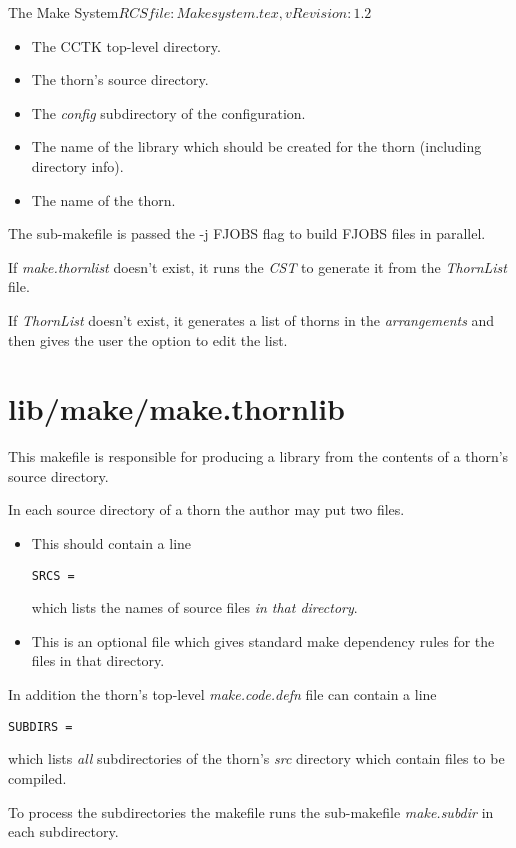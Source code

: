 \begin{cactuspart}{3}{The Make System}{$RCSfile: Makesystem.tex,v $}{$Revision: 1.2 $}
\begin{itemize}
\item[TOP]
The CCTK top-level directory.
\item[SRCDIR]
The thorn's source directory.
\item[CONFIG]
The {\em config} subdirectory of the configuration. 
\item[NAME]
The name of the library which should be created for the thorn
(including directory info).
\item[THORN]
The name of the thorn.
\end{itemize}

The sub-makefile is passed the -j FJOBS flag to build FJOBS files in parallel.

If {\em make.thornlist} doesn't exist, it runs the {\em CST} to generate it from
the {\em ThornList} file.

If {\em ThornList} doesn't exist, it generates a list of thorns in the 
{\em arrangements} and then gives the user the option to edit the
list.

\section{lib/make/make.thornlib}
\label{sec:makefiles:thornlib}

This makefile is responsible for producing a library from the contents of a
thorn's source directory.

In each source directory of a thorn the author may put two files.

\begin{itemize}
\item[make.code.defn]
This should contain a line
\begin{verbatim}
SRCS = 
\end{verbatim}
which lists the names of source files {\em in that directory}.
\item[make.code.deps]
This is an optional file which gives standard make dependency rules
for the files in that directory.
\end{itemize}

In addition the thorn's top-level {\em make.code.defn} file can
contain a line
\begin{verbatim}
SUBDIRS = 
\end{verbatim}

which lists {\em all} subdirectories of the thorn's {\em src} directory which
contain files to be compiled.

To process the subdirectories the makefile runs the sub-makefile {\em make.subdir}
in each subdirectory. 


\end{cactuspart}
